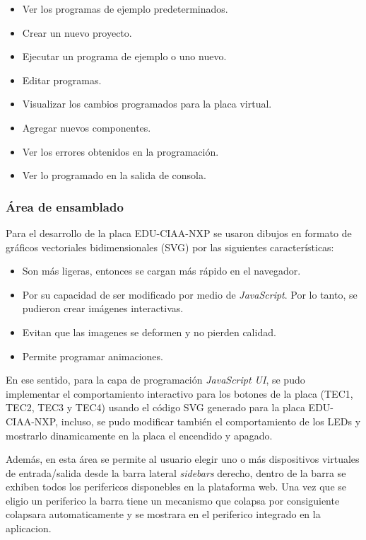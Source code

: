 \begin{itemize}
	\item Ver los programas de ejemplo predeterminados.
	\item Crear un nuevo proyecto.
	\item Ejecutar un programa de ejemplo o uno nuevo.
	\item Editar programas.
	\item Visualizar los cambios programados para la placa virtual.
	\item Agregar nuevos componentes.
	\item Ver los errores obtenidos en la programación.
	\item Ver lo programado en la salida de consola.
\end{itemize}

\subsubsection{Área de ensamblado}

Para el desarrollo de la placa EDU-CIAA-NXP se usaron dibujos en formato de gráficos vectoriales bidimensionales (SVG) por las siguientes características:

\begin{itemize}
	\item Son más ligeras, entonces se cargan más rápido en el navegador.
    \item Por su capacidad de ser modificado por medio de \textit{JavaScript}. Por lo tanto, se pudieron crear imágenes interactivas.
	\item Evitan que las imagenes se deformen y no pierden calidad.
	\item Permite programar animaciones.
\end{itemize}

En ese sentido, para la capa de programación \textit{JavaScript UI}, se pudo implementar el comportamiento interactivo para los botones de la placa (TEC1, TEC2, TEC3 y TEC4) usando el código SVG generado para la placa EDU-CIAA-NXP, incluso, se pudo modificar también el comportamiento de los LEDs y mostrarlo dinamicamente en la placa el encendido y apagado.


Además, en esta área se permite al usuario elegir uno o más dispositivos virtuales de entrada/salida desde la barra lateral \textit{sidebars} derecho, dentro de la barra se exhiben todos los perifericos disponebles en la plataforma web. Una vez que se eligio un periferico la barra tiene un mecanismo que colapsa por consiguiente colapsara automaticamente y se mostrara en el periferico integrado en la aplicacion.


